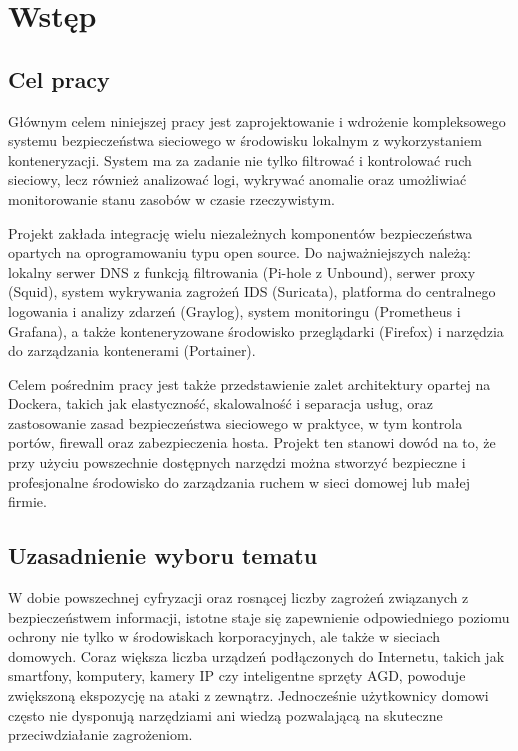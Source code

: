 \documentclass[
    left=2.5cm,         %
    right=2.5cm,        %
    top=2.5cm,          %
    bottom=3cm,         %
    bindingoffset=6mm,  %
    nohyphenation=true %
]{eiti/eiti-thesis} %
\begin{document}
\thispagestyle{empty}
\tableofcontents

\newpage 
\section{Wstęp}
\subsection{Cel pracy}

Głównym celem niniejszej pracy jest zaprojektowanie i wdrożenie kompleksowego systemu bezpieczeństwa sieciowego w środowisku lokalnym z wykorzystaniem konteneryzacji. System ma za zadanie nie tylko filtrować i kontrolować ruch sieciowy, lecz również analizować logi, wykrywać anomalie oraz umożliwiać monitorowanie stanu zasobów w czasie rzeczywistym.

Projekt zakłada integrację wielu niezależnych komponentów bezpieczeństwa opartych na oprogramowaniu typu open source. Do najważniejszych należą: lokalny serwer DNS z funkcją filtrowania (Pi-hole z Unbound), serwer proxy (Squid), system wykrywania zagrożeń IDS (Suricata), platforma do centralnego logowania i analizy zdarzeń (Graylog), system monitoringu (Prometheus i Grafana), a także konteneryzowane środowisko przeglądarki (Firefox) i narzędzia do zarządzania kontenerami (Portainer).

Celem pośrednim pracy jest także przedstawienie zalet architektury opartej na Dockera, takich jak elastyczność, skalowalność i separacja usług, oraz zastosowanie zasad bezpieczeństwa sieciowego w praktyce, w tym kontrola portów, firewall oraz zabezpieczenia hosta. Projekt ten stanowi dowód na to, że przy użyciu powszechnie dostępnych narzędzi można stworzyć bezpieczne i profesjonalne środowisko do zarządzania ruchem w sieci domowej lub małej firmie.

\subsection{Uzasadnienie wyboru tematu}

W dobie powszechnej cyfryzacji oraz rosnącej liczby zagrożeń związanych z bezpieczeństwem informacji, istotne staje się zapewnienie odpowiedniego poziomu ochrony nie tylko w środowiskach korporacyjnych, ale także w sieciach domowych. Coraz większa liczba urządzeń podłączonych do Internetu, takich jak smartfony, komputery, kamery IP czy inteligentne sprzęty AGD, powoduje zwiększoną ekspozycję na ataki z zewnątrz. Jednocześnie użytkownicy domowi często nie dysponują narzędziami ani wiedzą pozwalającą na skuteczne przeciwdziałanie zagrożeniom.
\end{document}
